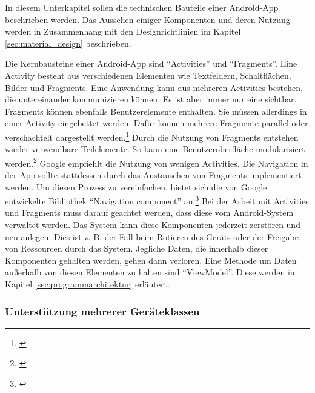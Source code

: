 In diesem Unterkapitel sollen die technischen Bauteile einer Android-App beschrieben werden. Das Aussehen einiger Komponenten und deren Nutzung werden in Zusammenhang mit den Designrichtlinien im Kapitel \ref{sec:material_design} beschrieben.

Die Kernbausteine einer Android-App sind \enquote{Activities} und \enquote{Fragments}. Eine Activity besteht aus verschiedenen Elementen wie Textfeldern, Schaltflächen, Bilder und Fragments. Eine Anwendung kann aus mehreren Activities bestehen, die untereinander kommunizieren können. Es ist aber immer nur eine sichtbar. Fragments können ebenfalls Benutzerelemente enthalten. Sie müssen allerdings in einer Activity eingebettet werden. Dafür können mehrere Fragmente parallel oder verschachtelt dargestellt werden.\footnote{\cite[Vgl.][48\psq]{Hagos2020}} Durch die Nutzung von Fragments entstehen wieder verwendbare Teilelemente. So kann eine Benutzeroberfläche modularisiert werden.\footnote{\cite[Vgl.][]{AndroidFragments2020}} Google empfiehlt die Nutzung von wenigen Activities. Die Navigation in der App sollte stattdessen durch das Austauschen von Fragments implementiert werden. Um diesen Prozess zu vereinfachen, bietet sich die von Google entwickelte Bibliothek \enquote{Navigation component} an.\footnote{\cite[Vgl.][]{AndroidNavigationComponent2020}} Bei der Arbeit mit Activities und Fragments muss darauf geachtet werden, dass diese vom Android-System verwaltet werden. Das System kann diese Komponenten jederzeit zerstören und neu anlegen. Dies ist z. B. der Fall beim Rotieren des Geräts oder der Freigabe von Ressourcen durch das System. Jegliche Daten, die innerhalb dieser Komponenten gehalten werden, gehen dann verloren. Eine Methode um Daten außerhalb von diesen Elementen zu halten sind \enquote{ViewModel}. Diese werden in Kapitel \ref{sec:programmarchitektur} erläutert.

\subsubsection{Unterstützung mehrerer Geräteklassen}
\label{sec:geraeteklassen}

